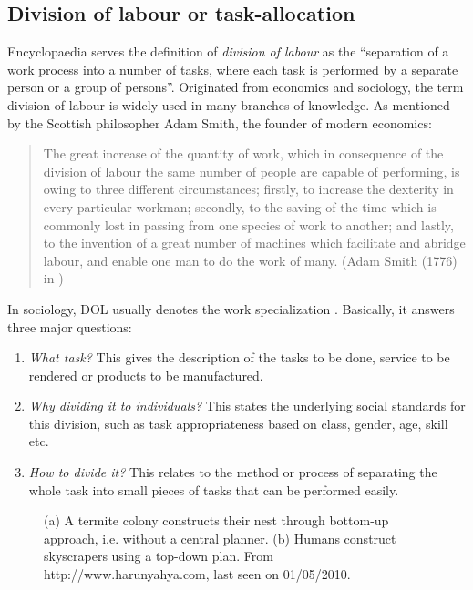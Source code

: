 \subsection{Division of labour or task-allocation}
\label{bg:def:dol}
Encyclopaedia  serves the definition of {\em division of labour} as the ``separation of a work process into a number of tasks, where each task is performed by a separate person or a group of persons''. Originated from economics and sociology, the term division of labour is widely used in many branches of knowledge. As mentioned by the Scottish philosopher Adam Smith, the founder of modern economics:
\begin{quote}
\ssp 
The great increase of the quantity of work, which in consequence of the division of labour the same number of people are capable of performing, is owing to three different circumstances; firstly, to increase the dexterity in every particular workman; secondly, to the saving of the time which is commonly lost in passing from one species of work to another; and lastly, to the invention of a great number of machines which facilitate and abridge labour, and enable one man to do the work of many.
(Adam Smith (1776) in )
\end{quote} 
\sdp
In sociology, DOL usually denotes the work specialization \cite{Sayer+1992}. Basically, it answers three major questions:
\begin{enumerate}
\item {\em What task?} This gives the description of the tasks to be done, service to be rendered or products to be manufactured.
\item {\em Why dividing it to individuals?} This states the underlying social standards for this division, such as task appropriateness based on class, gender, age, skill etc.
\item {\em How to divide it?} This relates to the method or process of separating the whole task into small pieces of tasks that can be performed easily. 
\end{enumerate}
\begin{figure}[H]
\centering
{} 
\hspace{0.25cm}
\caption{(a) A termite colony constructs their nest through bottom-up approach, i.e. without a central planner. (b) Humans construct skyscrapers using a top-down plan. From http://www.harunyahya.com, last seen on 01/05/2010.}
\label{fig:termite-nest}
\end{figure}
